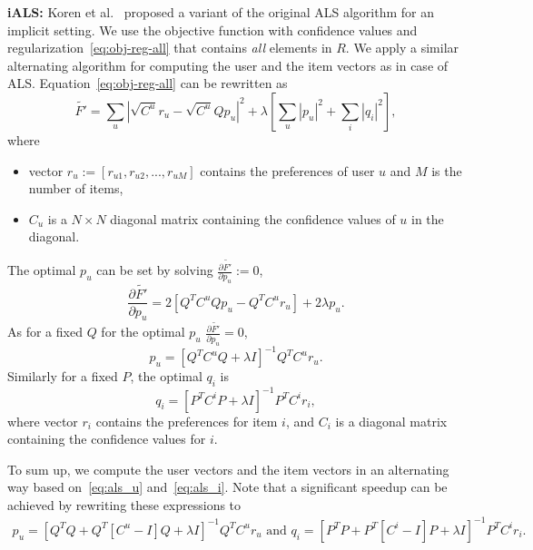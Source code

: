 \documentclass[10pt]{article}
\newenvironment{myitemize}{\begin{itemize} \setlength{\topsep}{0pt} \setlength{\itemsep}{0pt} \setlength{\parskip}{0pt} \setlength{\parsep}{0pt}}{  \end{itemize} }
\begin{document}
\textbf{iALS:}  
Koren et al.~\cite{hu2008collaborative} proposed a variant of the original ALS algorithm for an implicit setting.
We use the objective function with confidence values and regularization~\eqref{eq:obj-reg-all} that contains \emph{all} elements in $R$.
We apply a similar alternating algorithm for computing the user and the item vectors as in case of ALS.
Equation~\eqref{eq:obj-reg-all} can be rewritten as
\begin{equation}
	\tilde{F'} = \displaystyle\sum_u \left | \sqrt{C^u} r_u - \sqrt{C^u} Q p_u \right | ^ 2 + \lambda \left [  \displaystyle\sum_u | p_u | ^ 2 + \displaystyle\sum_i |q_i| ^ 2\right],
\end{equation}
where
\begin{myitemize}
\item vector $r_u:= \left [ r_{u1}, r_{u2}, ..., r_{uM} \right ]$ contains the preferences of user $u$ and $M$ is the number of items,
\item $C_u$ is a $N \times N$ diagonal matrix containing the confidence values of $u$ in the diagonal.
\end{myitemize}
The optimal $p_u$ can be set by solving $\frac{\partial\tilde{F'}}{\partial p_u}:=0$,
\begin{equation}
	\frac{\partial \tilde{F'} }{\partial p_u} =  2 \left [ Q^T C^u Q p_u  - Q^T C^u r_u \right ]  + 2 \lambda p_u.
\end{equation}
As for a fixed $Q$ for the optimal $p_u$  $\frac{\partial \tilde{F'} }{\partial p_u} = 0$,
\begin{equation}
	p_u =  \left [ Q^T C^u Q + \lambda I \right ] ^ {-1} Q^T C^u r_u.
	\label{eq:als_u}
\end{equation}
Similarly for a fixed $P$, the optimal $q_i$ is
\begin{equation}
	q_i =  \left [ P^T C^i P + \lambda I \right ] ^ {-1} P^T C^i r_i,
	\label{eq:als_i}
\end{equation}
where  vector $r_i$ contains the preferences for item $i$, and $C_i$ is a diagonal matrix containing the confidence values for $i$.

To sum up, we compute the user vectors and the item vectors in an alternating way based on~\eqref{eq:als_u} and~\eqref{eq:als_i}.
Note that a significant speedup can be achieved by rewriting these expressions to 
\begin{gather}
		p_u =  \left [ Q^T Q + Q^T [C^u  - I ] Q + \lambda I \right ] ^ {-1} Q^T C^u r_u\text{ and }
		q_i =  \left [ P^T P + P^T [C^i - I] P + \lambda I \right ] ^ {-1} P^T C^i r_i.
\end{gather}
\end{document}
